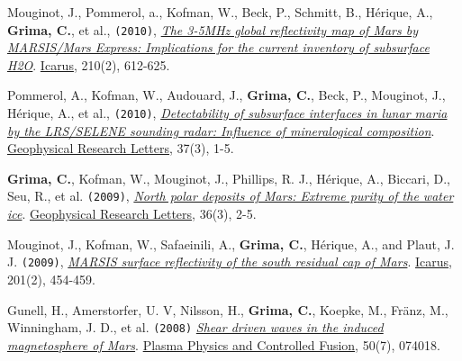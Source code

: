 \begin{etaremune}
\item
  Mouginot, J., Pommerol, a., Kofman, W., Beck, P., Schmitt, B.,
  Hérique, A., \textbf{Grima, C.}, et al., \texttt{(2010)},
  \href{https://www.google.com/url?sa=t\&rct=j\&q=\&esrc=s\&source=web\&cd=1\&cad=rja\&ved=0CDAQFjAA\&url=http\%3A\%2F\%2Fess.uci.edu\%2Fresearchgrp\%2Ferignot\%2Ffiles\%2Fmouginot_icarus_2010.pdf\&ei=j6inUdytH5HA9QSNx4FQ\&usg=AFQjCNHiVV4-tjSgM28QWYY64vKaSa2U4Q\&sig2=fGYDJTm_cOpv0rwZIGDX6A\&bvm=bv.47244034,d.eWU}{
  \emph{The 3-5MHz global reflectivity map of Mars by MARSIS/Mars
  Express: Implications for the current inventory of subsurface H2O}}.
  \ul{Icarus}, 210(2), 612-625.
\item
  Pommerol, A., Kofman, W., Audouard, J., \textbf{Grima, C.}, Beck, P.,
  Mouginot, J., Hérique, A., et al., \texttt{(2010)},
  \href{http://onlinelibrary.wiley.com/doi/10.1029/2009GL041681/abstract}{\emph{Detectability
  of subsurface interfaces in lunar maria by the LRS/SELENE sounding
  radar: Influence of mineralogical composition}}. \ul{Geophysical Research
  Letters}, 37(3), 1-5.
\item
  \textbf{Grima, C.}, Kofman, W., Mouginot, J., Phillips, R. J.,
  Hérique, A., Biccari, D., Seu, R., et al. \texttt{(2009)},
  \href{http://onlinelibrary.wiley.com/doi/10.1029/2008GL036326/abstract}{\emph{North
  polar deposits of Mars: Extreme purity of the water ice}}. \ul{Geophysical
  Research Letters}, 36(3), 2-5.
\item
  Mouginot, J., Kofman, W., Safaeinili, A., \textbf{Grima, C.}, Hérique,
  A., and Plaut, J. J. \texttt{(2009)},
  \href{http://www.sciencedirect.com/science/article/pii/S0019103509000311}{
  \emph{MARSIS surface reflectivity of the south residual cap of Mars}}.
  \ul{Icarus}, 201(2), 454-459.
\item
  Gunell, H., Amerstorfer, U. V, Nilsson, H., \textbf{Grima, C.},
  Koepke, M., Fränz, M., Winningham, J. D., et al. \texttt{(2008)}
  \href{http://iopscience.iop.org/0741-3335/50/7/074018}{\emph{Shear
  driven waves in the induced magnetosphere of Mars}}. \ul{Plasma Physics
  and Controlled Fusion}, 50(7), 074018.
\end{etaremune}
